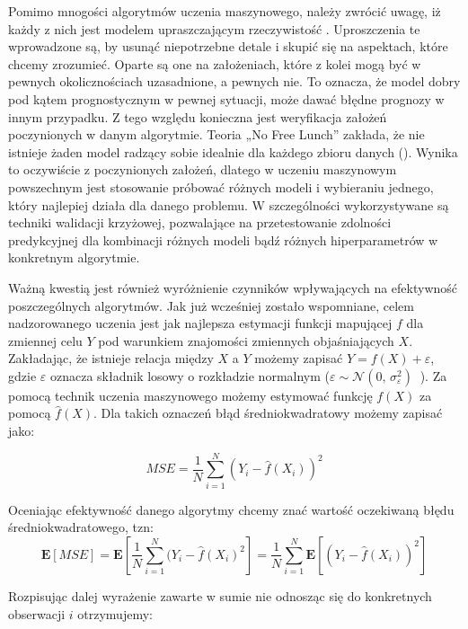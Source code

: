 \documentclass[12pt,a4paper,twoside,openany]{book}
\begin{document}
Pomimo mnogości algorytmów uczenia maszynowego, należy zwrócić uwagę, iż każdy z nich jest modelem upraszczającym rzeczywistość \citep{hoffmann1990}. Uproszczenia te wprowadzone są, by usunąć niepotrzebne detale i skupić się na aspektach, które chcemy zrozumieć. Oparte są one na założeniach, które z kolei mogą być w pewnych okolicznościach uzasadnione, a pewnych nie. To oznacza, że model dobry pod kątem prognostycznym w pewnej sytuacji, może dawać błędne prognozy w innym przypadku. Z tego względu konieczna jest weryfikacja założeń poczynionych w danym algorytmie. Teoria „No Free Lunch” zakłada, że nie istnieje żaden model radzący sobie idealnie dla każdego zbioru danych (\citet{wolpert1996}). Wynika to oczywiście z poczynionych założeń, dlatego w uczeniu maszynowym powszechnym jest stosowanie próbować różnych modeli i wybieraniu jednego, który najlepiej działa dla danego problemu. W szczególności wykorzystywane są techniki walidacji krzyżowej, pozwalające na przetestowanie zdolności predykcyjnej dla kombinacji różnych modeli bądź różnych hiperparametrów w konkretnym algorytmie.

Ważną kwestią jest również wyróżnienie czynników wpływających na efektywność poszczególnych algorytmów. Jak już wcześniej zostało wspomniane, celem nadzorowanego uczenia jest jak najlepsza estymacji funkcji mapującej $f$ dla zmiennej celu $Y$ pod warunkiem znajomości zmiennych objaśniających $X$. Zakładając, że istnieje relacja między $X$ a $Y$ możemy zapisać $Y=f(X) + \varepsilon$, gdzie $\varepsilon$ oznacza składnik losowy o rozkładzie normalnym ($\varepsilon \sim \mathcal{N}(0,\,\sigma_{\varepsilon}^{2})\ $ ). Za pomocą technik uczenia maszynowego możemy estymować funkcję $f(X)$ za pomocą $\hat{f}(X)$. Dla takich oznaczeń błąd średniokwadratowy możemy zapisać jako:

\begin{equation} \label{wzor9a}
MSE = \frac{1}{N}\sum_{i = 1}^{N}(Y_i - \hat{f}(X_i))^{2}
\end{equation}

Oceniając efektywność danego algorytmy chcemy znać wartość oczekiwaną błędu średniokwadratowego, tzn:
\begin{equation} \label{wzor9b}
\mathbf{E}[MSE] = \mathbf{E}[\frac{1}{N}\sum_{i = 1}^{N}(Y_i - \hat{f}(X_i)^{2}] = \frac{1}{N}\sum_{i = 1}^{N}\mathbf{E}[(Y_i - \hat{f}(X_i))^{2}]
\end{equation}

Rozpisując dalej wyrażenie zawarte w sumie nie odnosząc się do konkretnych obserwacji $i$ otrzymujemy:
\end{document}

